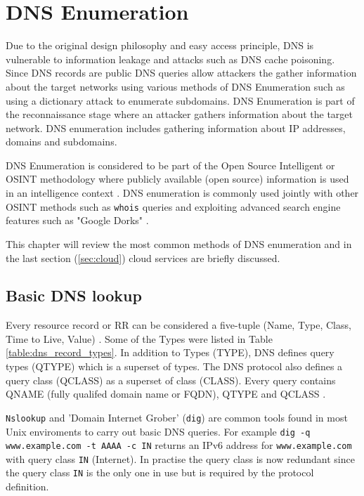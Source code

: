 \section{DNS Enumeration}

Due to the original design philosophy and easy access principle, DNS is vulnerable to information leakage and attacks such as DNS cache poisoning. Since DNS records are public DNS queries allow attackers the gather information about the target networks using various methods of DNS Enumeration such as using a dictionary attack to enumerate subdomains. DNS Enumeration is part of the reconnaissance stage where an attacker gathers information about the target network. DNS enumeration includes gathering information about IP addresses, domains and subdomains.

DNS Enumeration is considered to be part of the Open Source Intelligent or OSINT methodology where publicly available (open source) information is used in an intelligence context \cite{network_sec_assessment}. DNS enumeration is commonly used jointly with other OSINT methods such as \texttt{whois} queries and exploiting advanced search engine features such as "Google Dorks" \cite{network_sec_assessment}.

This chapter will review the most common methods of DNS enumeration and in the last section (\ref{sec:cloud}) cloud services are briefly discussed.

\subsection{Basic DNS lookup}

Every resource record or RR can be considered a five-tuple (Name, Type, Class, Time to Live, Value) \cite{RFC1035}. Some of the Types were listed in Table \ref{table:dns_record_types}. In addition to Types (TYPE), DNS defines query types (QTYPE) which is a superset of types. The DNS protocol also defines a query class (QCLASS) as a superset of class (CLASS). Every query contains QNAME (fully qualifed domain name or FQDN), QTYPE and QCLASS \cite{RFC1035}.

\texttt{Nslookup} and 'Domain Internet Grober' (\texttt{dig}) are common tools found in most Unix enviroments to carry out basic DNS queries. For example \texttt{dig -q www.example.com -t AAAA -c IN} returns an IPv6 address for \texttt{www.example.com} with query class \texttt{IN} (Internet). In practise the query class is now redundant since the query class \texttt{IN} is the only one in use but is required by the protocol definition.


